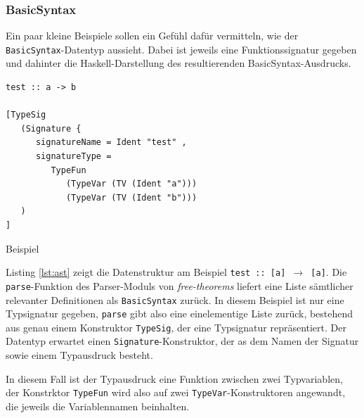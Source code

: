 

\subsubsection*{BasicSyntax}

\label{sec:basic-syntax}

Ein paar kleine Beispiele sollen ein Gefühl dafür vermitteln, wie der \texttt{BasicSyntax}-Datentyp aussieht. Dabei ist jeweils
eine Funktionssignatur gegeben und dahinter die Haskell-Darstellung des resultierenden BasicSyntax-Ausdrucks.

\begin{listing}[ht]
\begin{verbatim}
test :: a -> b

[TypeSig
   (Signature {
      signatureName = Ident "test" ,
      signatureType =
         TypeFun
            (TypeVar (TV (Ident "a")))
            (TypeVar (TV (Ident "b")))
   )
]

\end{verbatim}
\caption{Beispiel}
\label{lst:ast}
\end{listing}

Listing \ref{lst:ast} zeigt die Datenstruktur am Beispiel \texttt{test :: [a] $\rightarrow$ [a]}. Die \texttt{parse}-Funktion des Parser-Moduls von \textit{free-theorems} liefert eine Liste sämtlicher relevanter Definitionen als \texttt{BasicSyntax} zurück.
In diesem Beispiel ist nur eine Typsignatur gegeben, \texttt{parse} gibt also eine einelementige Liste zurück, bestehend aus
genau einem Konstruktor \texttt{TypeSig}, der eine Typsignatur repräsentiert. Der Datentyp erwartet einen
\texttt{Signature}-Konstruktor, der as dem Namen der Signatur sowie einem Typausdruck besteht.

In diesem Fall ist der Typausdruck eine Funktion zwischen zwei Typvariablen, der Konstrktor \texttt{TypeFun} wird also
auf zwei \texttt{TypeVar}-Konstruktoren angewandt, die jeweils die Variablennamen beinhalten.

